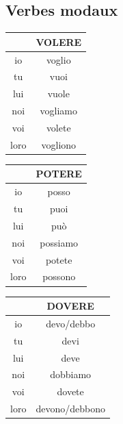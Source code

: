 \documentclass[12pt, openany]{report}
\begin{document}
\subsection{Verbes modaux}
\begin{minipage}{.315\textwidth}
    \begin{center}
        \begin{tabular}{c||c}
            & VOLERE \\ \hline
            io & voglio\\
            tu & vuoi\\
            lui & vuole\\
            noi & vogliamo\\
            voi & volete \\
            loro & vogliono \\
        \end{tabular}
    \end{center}
\end{minipage}
\begin{minipage}{.315\textwidth}
    \begin{center}
        \begin{tabular}{c||c}
            & POTERE \\ \hline
            io & posso \\
            tu & puoi \\
            lui & può\\
            noi & possiamo\\
            voi & potete\\
            loro & possono\\
        \end{tabular}
    \end{center}
\end{minipage}
\begin{minipage}{.315\textwidth}
    \begin{center}
        \begin{tabular}{c||c}
            & DOVERE \\ \hline
            io & devo/debbo\\
            tu & devi \\
            lui & deve \\
            noi & dobbiamo \\
            voi & dovete \\
            loro & devono/debbono\\
        \end{tabular}
    \end{center}
\end{minipage}
\end{document}
